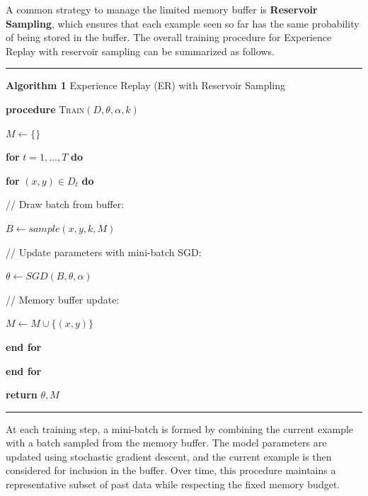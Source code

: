 A common strategy to manage the limited memory buffer is \textbf{Reservoir Sampling},
which ensures that each example seen so far has the same probability of being stored in
the buffer. The overall training procedure for Experience Replay with reservoir sampling
can be summarized as follows.


\noindent\rule{\textwidth}{0.8pt}

\noindent\textbf{Algorithm 1} Experience Replay (ER) with Reservoir Sampling

\noindent\textbf{procedure} \textsc{Train}$(D, \theta, \alpha, k)$

\noindent\hspace{0.6cm}$M \leftarrow \{\}$

\noindent\hspace{0.6cm}\textbf{for} $t = 1, \ldots, T$ \textbf{do}

\noindent\hspace{1.2cm}\textbf{for} $(x, y) \in D_t$ \textbf{do}

\noindent\hspace{1.8cm}// Draw batch from buffer:

\noindent\hspace{1.8cm}$B \leftarrow sample(x, y, k, M)$

\noindent\hspace{1.8cm}// Update parameters with mini-batch SGD:

\noindent\hspace{1.8cm}$\theta \leftarrow SGD(B, \theta, \alpha)$

\noindent\hspace{1.8cm}// Memory buffer update:

\noindent\hspace{1.8cm}$M \leftarrow M \cup \{(x, y)\}$

\noindent\hspace{1.2cm}\textbf{end for}

\noindent\hspace{0.6cm}\textbf{end for}

\noindent\textbf{return} $\theta, M$

\noindent\rule{\textwidth}{0.8pt}

At each training step, a mini-batch is formed by combining the current example with a
batch sampled from the memory buffer. The model parameters are updated using stochastic
gradient descent, and the current example is then considered for inclusion in the buffer.
Over time, this procedure maintains a representative subset of past data while respecting
the fixed memory budget.

